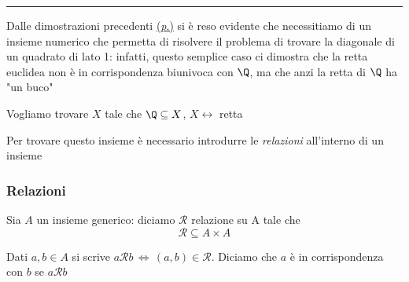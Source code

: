 \rule{7em}{.4pt}

Dalle dimostrazioni precedenti \hyperref[prp:sdfsdfsdfdd]{(\textit{p}.)} si è reso evidente che necessitiamo di un insieme numerico che permetta di risolvere il problema di trovare la diagonale di un quadrato di lato 1: infatti, questo semplice caso ci dimostra che la retta euclidea non è in corrispondenza biunivoca con $ \Q $, ma che anzi la retta di $ \Q $ ha "un buco"

Vogliamo trovare $ X $ tale che $ \Q \subseteq X $, $ X \leftrightarrow $ retta

Per trovare questo insieme è necessario introdurre le \textit{relazioni} all'interno di un insieme

\subsubsection{Relazioni}

Sia $ A $ un insieme generico: diciamo $ \mathcal{R}  $ relazione su A tale che \[
    \mathcal{R} \subseteq A\times A
\]

Dati $ a, b \in A $ si scrive $ a\mathcal{R}b \,\iff\, (a, b) \in \mathcal{R} $. Diciamo che $ a $ è in corrispondenza con $ b $ se $ a\mathcal{R}b $



